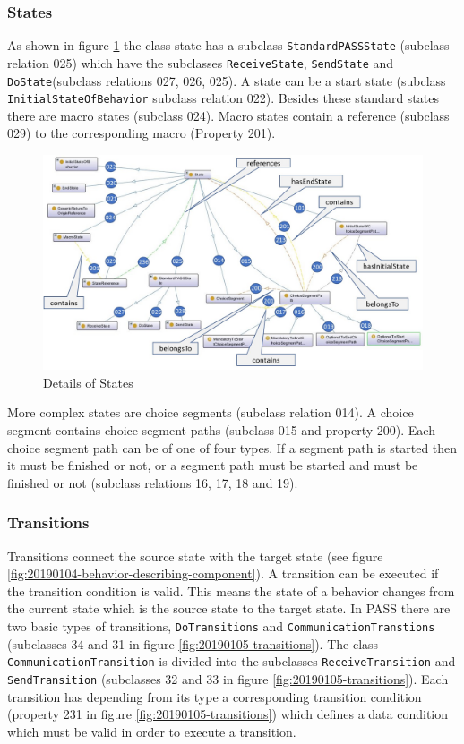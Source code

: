\subsubsection{States}

As shown in figure \ref{fig:20190109-states} the class state has a subclass \texttt{StandardPASSState} (subclass relation 025) which have the subclasses \texttt{ReceiveState}, \texttt{SendState} and \texttt{DoState}(subclass relations 027, 026, 025). A state can be a start state (subclass \texttt{InitialStateOfBehavior} subclass relation 022). Besides these standard states there are macro states (subclass 024). Macro states contain a reference (subclass 029) to the corresponding macro (Property 201).

\begin{figure}[htbp]
	\centering
	\includegraphics[width=1.0\linewidth]{Figures/Ontology/SubjectExecution/20190109-States}
	\caption[Details of States]{Details of States}
	\label{fig:20190109-states}
\end{figure}

More complex states are choice segments (subclass relation 014). A choice segment contains choice segment paths (subclass 015 and property 200). Each choice segment path can be of one of four types. If a segment path is started then it must be finished or not, or a segment path must be started and must be finished or not (subclass relations 16, 17, 18 and 19).

\subsubsection{Transitions}

Transitions connect the source state with the target state (see figure \ref{fig:20190104-behavior-describing-component}). A transition can be executed if the transition condition is valid. This means the state of a behavior changes from the current state which is the source state to the target state. In PASS there are two basic types of transitions, \texttt{DoTransitions} and \texttt{CommunicationTranstions} (subclasses 34 and 31 in figure \ref{fig:20190105-transitions}). The class \texttt{CommunicationTransition} is divided into the subclasses \texttt{ReceiveTransition} and \texttt{SendTransition} (subclasses 32 and 33 in figure \ref{fig:20190105-transitions}). Each transition has depending from its type a corresponding transition condition (property 231 in figure  \ref{fig:20190105-transitions}) which defines a data condition which must be valid in order to execute a transition.

